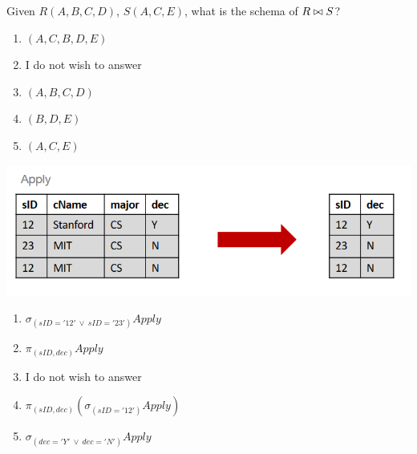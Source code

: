 \documentclass{bdad}
\begin{document}
Given $R(A, B, C, D)$, $S(A, C, E)$, what is the schema of $R \bowtie S$?

\begin{enumerate}
    \item $(A, C, B, D, E)$
    \item I do not wish to answer
    \item $(A, B, C, D)$
    \item $(B, D, E)$
    \item $(A, C, E)$
\end{enumerate}

\newpage
{}
\begin{center}
    \includegraphics[scale=0.4]{2020T-25.png}
\end{center}

\begin{enumerate}
    \item $\sigma_{(sID = '12'~\vee~sID = '23')} Apply$
    \item $\pi_{(sID,dec)} Apply$
    \item I do not wish to answer
    \item $\pi_{(sID,dec)} (\sigma_{(sID = '12')} Apply)$
    \item $\sigma_{(dec = 'Y'~\vee~dec = 'N')} Apply$
\end{enumerate}
\end{document}

